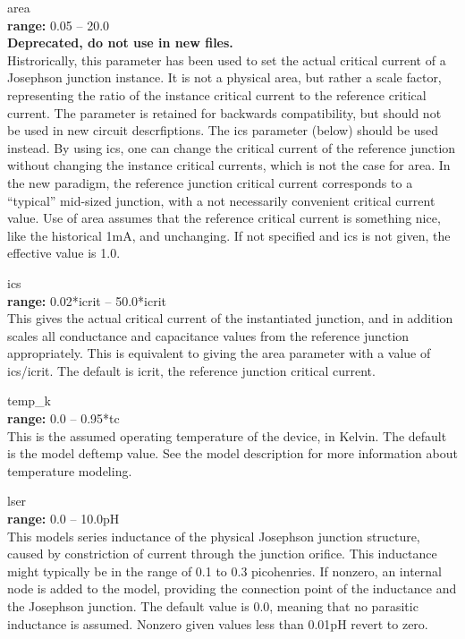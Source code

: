 \begin{description}
\item{\vt area}\\
{\bf range:} 0.05 -- 20.0\\
{\bf Deprecated, do not use in new files.}\\
Histrorically, this parameter has been used to set the actual critical
current of a Josephson junction instance.  It is not a physical area,
but rather a scale factor, representing the ratio of the instance
critical current to the reference critical current.  The parameter is
retained for backwards compatibility, but should not be used in new
circuit descrfiptions.  The {\vt ics} parameter (below) should be used
instead.  By using {\vt ics}, one can change the critical current of
the reference junction without changing the instance critical
currents, which is not the case for {\vt area}.  In the new paradigm,
the reference junction critical current corresponds to a ``typical''
mid-sized junction, with a not necessarily convenient critical current
value.  Use of {\vt area} assumes that the reference critical current
is something nice, like the historical 1mA, and unchanging.  If not
specified and {\vt ics} is not given, the effective value is 1.0.

\item{\vt ics}\\
{\bf range:} 0.02*{\vt icrit} -- 50.0*{\vt icrit}\\
This gives the actual critical current of the instantiated junction,
and in addition scales all conductance and capacitance values from the
reference junction appropriately.  This is equivalent to giving the
{\vt area} parameter with a value of {\vt ics}/{\vt icrit}.  The
default is {\vt icrit}, the reference junction critical current.

\item{\vt temp\_k}\\
{\bf range:} 0.0 -- 0.95*{\vt tc}\\
This is the assumed operating temperature of the device, in Kelvin. 
The default is the model {\vt deftemp} value.  See the model description
for more information about temperature modeling.

\item{\vt lser}\\
{\bf range:} 0.0 -- 10.0pH\\
This models series inductance of the physical Josephson junction
structure, caused by constriction of current through the junction
orifice.  This inductance might typically be in the range of 0.1 to
0.3 picohenries.  If nonzero, an internal node is added to the model,
providing the connection point of the inductance and the Josephson
junction.  The default value is 0.0, meaning that no parasitic
inductance is assumed.  Nonzero given values less than 0.01pH revert
to zero.


\end{description}
